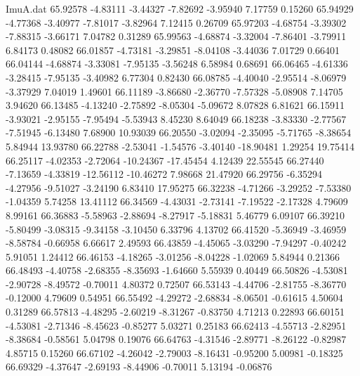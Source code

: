 \begin{filecontents}{ImuA.dat}
  65.92578   -4.83111   -3.44327   -7.82692   -3.95940    7.17759    0.15260
  65.94929   -4.77368   -3.40977   -7.81017   -3.82964    7.12415    0.26709
  65.97203   -4.68754   -3.39302   -7.88315   -3.66171    7.04782    0.31289
  65.99563   -4.68874   -3.32004   -7.86401   -3.79911    6.84173    0.48082
  66.01857   -4.73181   -3.29851   -8.04108   -3.44036    7.01729    0.66401
  66.04144   -4.68874   -3.33081   -7.95135   -3.56248    6.58984    0.68691
  66.06465   -4.61336   -3.28415   -7.95135   -3.40982    6.77304    0.82430
  66.08785   -4.40040   -2.95514   -8.06979   -3.37929    7.04019    1.49601
  66.11189   -3.86680   -2.36770   -7.57328   -5.08908    7.14705    3.94620
  66.13485   -4.13240   -2.75892   -8.05304   -5.09672    8.07828    6.81621
  66.15911   -3.93021   -2.95155   -7.95494   -5.53943    8.45230    8.64049
  66.18238   -3.83330   -2.77567   -7.51945   -6.13480    7.68900   10.93039
  66.20550   -3.02094   -2.35095   -5.71765   -8.38654    5.84944   13.93780
  66.22788   -2.53041   -1.54576   -3.40140  -18.90481    1.29254   19.75414
  66.25117   -4.02353   -2.72064  -10.24367  -17.45454    4.12439   22.55545
  66.27440   -7.13659   -4.33819  -12.56112  -10.46272    7.98668   21.47920
  66.29756   -6.35294   -4.27956   -9.51027   -3.24190    6.83410   17.95275
  66.32238   -4.71266   -3.29252   -7.53380   -1.04359    5.74258   13.41112
  66.34569   -4.43031   -2.73141   -7.19522   -2.17328    4.79609    8.99161
  66.36883   -5.58963   -2.88694   -8.27917   -5.18831    5.46779    6.09107
  66.39210   -5.80499   -3.08315   -9.34158   -3.10450    6.33796    4.13702
  66.41520   -5.36949   -3.46959   -8.58784   -0.66958    6.66617    2.49593
  66.43859   -4.45065   -3.03290   -7.94297   -0.40242    5.91051    1.24412
  66.46153   -4.18265   -3.01256   -8.04228   -1.02069    5.84944    0.21366
  66.48493   -4.40758   -2.68355   -8.35693   -1.64660    5.55939    0.40449
  66.50826   -4.53081   -2.90728   -8.49572   -0.70011    4.80372    0.72507
  66.53143   -4.44706   -2.81755   -8.36770   -0.12000    4.79609    0.54951
  66.55492   -4.29272   -2.68834   -8.06501   -0.61615    4.50604    0.31289
  66.57813   -4.48295   -2.60219   -8.31267   -0.83750    4.71213    0.22893
  66.60151   -4.53081   -2.71346   -8.45623   -0.85277    5.03271    0.25183
  66.62413   -4.55713   -2.82951   -8.38684   -0.58561    5.04798    0.19076
  66.64763   -4.31546   -2.89771   -8.26122   -0.82987    4.85715    0.15260
  66.67102   -4.26042   -2.79003   -8.16431   -0.95200    5.00981   -0.18325
  66.69329   -4.37647   -2.69193   -8.44906   -0.70011    5.13194   -0.06876

\end{filecontents}

